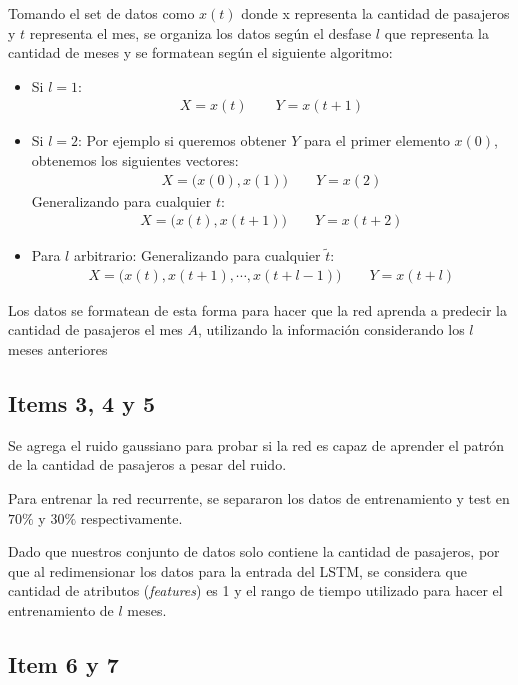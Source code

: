 Tomando el set de datos como $x(t)$ donde x representa la cantidad de pasajeros y $t$ representa el mes, se organiza los datos según el desfase $l$ que representa la cantidad de meses y se formatean según el siguiente algoritmo:

\begin{itemize}
\item Si  $l=1$:
	\begin{align*}
		X = x(t) \qquad Y = x(t+1)
	\end{align*}
\item 	 Si $l=2$:
	Por ejemplo si queremos obtener $Y$ para el primer  elemento $x(0)$, obtenemos los siguientes vectores:
	\begin{align*}
		X = \big ( x(0), x(1) \big ) \qquad Y = x(2)
	\end{align*}
	Generalizando para cualquier $t$:
	\begin{align*}
		X = \big ( x(t), x(t+1) \big ) \qquad Y = x(t+2)
	\end{align*}
\item 	 Para $l$ arbitrario:
	Generalizando para cualquier $\tilde{t}$:
	\begin{align*}
		X = \big ( x(t), x(t+1),\cdots, x(t+l-1) \big ) \qquad Y = x(t+l)
	\end{align*}

\end{itemize}

Los datos se formatean de esta forma para hacer que la red aprenda a predecir la cantidad de pasajeros el mes $A$, utilizando la información considerando los $l$ meses anteriores

\subsection*{Items 3, 4 y 5}

Se agrega el ruido gaussiano para probar si la red es capaz de aprender el patrón de la cantidad de pasajeros a pesar del ruido. 

Para entrenar la red recurrente, se separaron los datos de entrenamiento y test en $70\%$ y $30\%$ respectivamente. 

Dado que nuestros conjunto de datos solo contiene la cantidad de pasajeros, por que al redimensionar los datos para la entrada del LSTM, se considera que cantidad de atributos  (\emph{features}) es 1 y el rango de tiempo utilizado para hacer el entrenamiento de $l$ meses.

\subsection*{Item 6 y 7}


